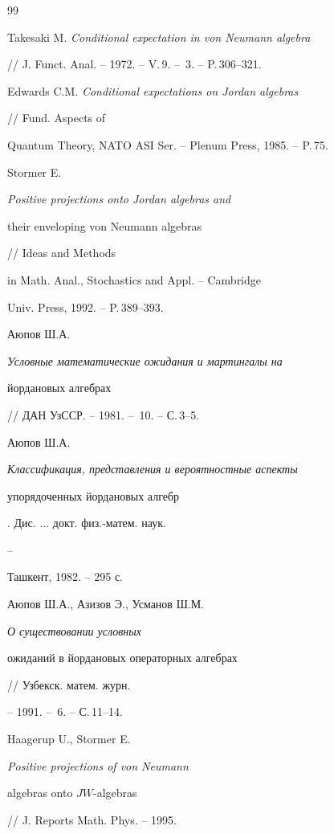  


 


\begin{thebibliography}{99} 


 




Takesaki M. {\em Conditional expectation in von Neumann algebra} 


// J. Funct. Anal. -- 1972. -- V.\,9. -- \No\,3. -- P.\,306--321. 




Edwards C.M. {\em Conditional expectations on Jordan algebras} 


// Fund. Aspects of 


Quantum Theory, NATO ASI Ser. -- Plenum Press, 1985. -- P.\,75. 




Stormer E. {\em Positive projections onto Jordan algebras and 


their enveloping von Neumann algebras} // Ideas and Methods 


in Math. Anal., Stochastics and Appl. -- Cambridge 


Univ. Press, 1992. -- P.\,389--393. 




Аюпов Ш.А. {\em Условные математические ожидания и мартингалы на 


йордановых алгебрах} // ДАН УзССР. -- 1981. -- \No\,10. -- С.\,3--5. 




Аюпов Ш.А. {\em Классификация, представления и вероятностные аспекты 


упорядоченных йордановых алгебр}. Дис. $\dotsc$ докт. физ.-матем. наук. 


-- 


Ташкент, 1982. -- 295 с. 




Аюпов Ш.А., Азизов Э., Усманов Ш.М. {\em О существовании условных 


ожиданий в йордановых операторных алгебрах} // Узбекск. матем. журн. 


-- 1991. -- \No\,6. -- С.\,11--14. 




Haagerup U., Stormer E. {\em Positive projections of von Neumann 


algebras onto $JW$-algebras} // J. Reports Math. Phys. -- 1995. 



\end{thebibliography}
